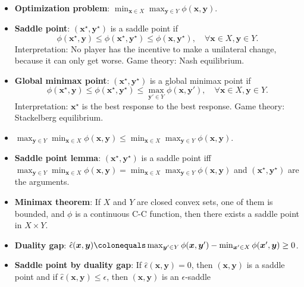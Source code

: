 \documentclass[8pt,a4paper]{extarticle}
\renewcommand{\vec}[1]{\bm{#1}}
\newenvironment{topic}[1]
{\textbf{\sffamily \colorbox{black}{\rlap{\textbf{\textcolor{white}{#1}}}\hspace{\linewidth}\hspace{-2\fboxsep}}} \\ \vspace{0.2cm}}
{}
\begin{document}
\begin{multicols*}{2}
    \begin{topic}{Min-max optimization}
        \begin{itemize}
            \item \textbf{Optimization problem}: $\min_{\vec{x} \in X} \max_{\vec{y} \in Y} \phi(\vec{x}, \vec{y})$.
            \item \textbf{Saddle point}: $(\vec{x}^\star, \vec{y}^\star)$ is a saddle point if \[
                      \phi(\vec{x}^\star, \vec{y}) \leq \phi(\vec{x}^\star, \vec{y}^\star) \leq \phi(\vec{x}, \vec{y}^\star), \quad \forall \vec{x} \in X, \vec{y} \in Y.
                  \]
                  Interpretation: No player has the incentive to make a unilateral change, because it can only get
                  worse. Game theory: Nash equilibrium.
            \item \textbf{Global minimax point}: $(\vec{x}^\star, \vec{y}^\star)$ is a global minimax point if \[
                      \phi(\vec{x}^\star, \vec{y}) \leq \phi(\vec{x}^\star, \vec{y}^\star) \leq \max_{\vec{y}' \in Y} \phi(\vec{x}, \vec{y}'), \quad \forall \vec{x} \in X, \vec{y} \in Y.
                  \]
                  Interpretation: $\vec{x}^\star$ is the best response to the best response. Game theory: Stackelberg
                  equilibrium.
            \item $\max_{\vec{y} \in Y} \min_{\vec{x} \in X} \phi(\vec{x}, \vec{y}) \leq \min_{\vec{x} \in X} \max_{\vec{y} \in Y} \phi(\vec{x}, \vec{y})$.
            \item \textbf{Saddle point lemma}: $(\vec{x}^\star, \vec{y}^\star)$ is a saddle point iff $\max_{\vec{y} \in Y} \min_{\vec{x} \in X} \phi(\vec{x}, \vec{y}) = \min_{\vec{x} \in X} \max_{\vec{y} \in Y} \phi(\vec{x}, \vec{y})$ and $(\vec{x}^\star, \vec{y}^\star)$ are the arguments.
            \item \textbf{Minimax theorem}: If $X$ and $Y$ are closed convex sets, one of them is bounded, and $\phi$ is a continuous C-C function, then there exists a saddle point in $X \times Y$.
            \item \textbf{Duality gap}: $\hat{\epsilon}(\vec{x}, \vec{y}) \colonequals \max_{\vec{y}' \in Y} \phi(\vec{x}, \vec{y}') - \min_{\vec{x}' \in X} \phi(\vec{x}', \vec{y}) \geq 0$.
            \item \textbf{Saddle point by duality gap}: If $\hat{\epsilon}(\vec{x}, \vec{y}) = 0$, then $(\vec{x}, \vec{y})$ is a saddle point and if
                  $\hat{\epsilon}(\vec{x}, \vec{y}) \leq \epsilon$, then $(\vec{x}, \vec{y})$ is an $\epsilon$-saddle

\end{itemize}
\end{topic}
\end{multicols*}
\end{document}

